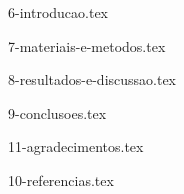 \documentclass[12pt,nodisplayskipstretch]{article}
\begin{document}









{6-introducao.tex}

{7-materiais-e-metodos.tex}

{8-resultados-e-discussao.tex}

{9-conclusoes.tex}

{11-agradecimentos.tex}

{10-referencias.tex}
\end{document}
